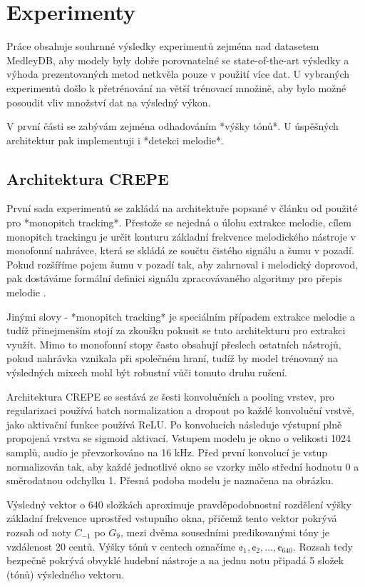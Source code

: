 \chapter{Experimenty}

Práce obsahuje souhrnné výsledky experimentů zejména nad datasetem MedleyDB, aby modely byly dobře porovnatelné se state-of-the-art výsledky a výhoda prezentovaných metod netkvěla pouze v použití více dat. U vybraných experimentů došlo k přetrénování na větší trénovací množině, aby bylo možné posoudit vliv množství dat na výsledný výkon. 

V první části se zabývám zejména odhadováním *výšky tónů*. U úspěšných architektur pak implementuji i *detekci melodie*.

\section{Architektura CREPE}

První sada experimentů se zakládá na architektuře popsané v článku od \cite{Kim2018} použité pro *monopitch tracking*. Přestože se nejedná o úlohu extrakce melodie, cílem monopitch trackingu je určit konturu základní frekvence melodického nástroje v monofonní nahrávce, která se skládá ze součtu čistého signálu a šumu v pozadí. Pokud rozšíříme pojem šumu v pozadí tak, aby zahrnoval i melodický doprovod, pak dostáváme formální definici signálu zpracovávaného algoritmy pro přepis melodie \cite{Salamon2014}.

Jinými slovy - *monopitch tracking* je speciálním případem extrakce melodie a tudíž přinejmenším stojí za zkoušku pokusit se tuto architekturu pro extrakci využít. Mimo to monofonní stopy často obsahují přeslech ostatních nástrojů, pokud nahrávka vznikala při společném hraní, tudíž by model trénovaný na výsledných mixech mohl být robustní vůči tomuto druhu rušení. 

Architektura CREPE se sestává ze šesti konvolučních a pooling vrstev, pro regularizaci používá batch normalization a dropout po každé konvoluční vrstvě, jako aktivační funkce používá ReLU. Po konvolucích následuje výstupní plně propojená vrstva se sigmoid aktivací. Vstupem modelu je okno o velikosti 1024 samplů, audio je převzorkováno na 16 kHz. Před první konvolucí je vstup normalizován tak, aby každé jednotlivé okno se vzorky mělo střední hodnotu 0 a směrodatnou odchylku 1. Přesná podoba modelu je naznačena na obrázku.

Výsledný vektor o 640 složkách aproximuje pravděpodobnostní rozdělení výšky základní frekvence uprostřed vstupního okna, přičemž tento vektor pokrývá rozsah od noty $C_{-1}$ po $G_{9}$, mezi dvěma sousedními predikovanými tóny je vzdálenost 20 centů. Výšky tónů v centech označíme $\cent_1, \cent_2, \dots, \cent_{640}$. Rozsah tedy bezpečně pokrývá obvyklé hudební nástroje a na jednu notu připadá 5 složek (tónů) výsledného vektoru.

